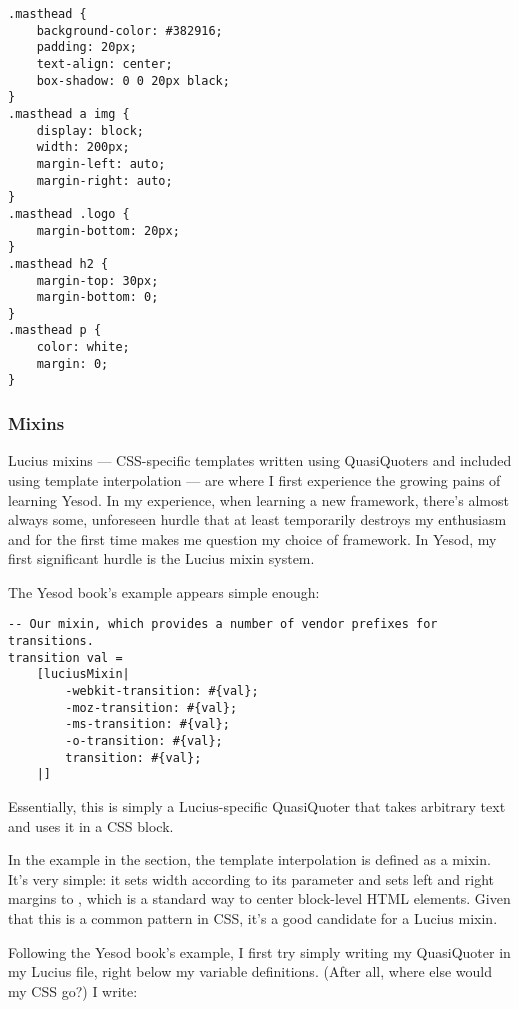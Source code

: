 \begin{Verbatim}[samepage=true]
.masthead {
    background-color: #382916;
    padding: 20px;
    text-align: center;
    box-shadow: 0 0 20px black;
}
.masthead a img {
    display: block;
    width: 200px;
    margin-left: auto;
    margin-right: auto;
}
.masthead .logo {
    margin-bottom: 20px;
}
.masthead h2 {
    margin-top: 30px;
    margin-bottom: 0;
}
.masthead p {
    color: white;
    margin: 0;
}
\end{Verbatim}

\subsubsection{Mixins} \label{luciusMixins}

Lucius mixins --- CSS-specific templates written using QuasiQuoters and included using template interpolation --- are where I first experience the growing pains of learning Yesod. In my experience, when learning a new framework, there's almost always some, unforeseen hurdle that at least temporarily destroys my enthusiasm and for the first time makes me question my choice of framework. In Yesod, my first significant hurdle is the Lucius mixin system. 

The Yesod book's example \cite{ybkShakes} appears simple enough:

\begin{Verbatim}[samepage=true]
-- Our mixin, which provides a number of vendor prefixes for transitions.
transition val =
    [luciusMixin|
        -webkit-transition: #{val};
        -moz-transition: #{val};
        -ms-transition: #{val};
        -o-transition: #{val};
        transition: #{val};
    |]
\end{Verbatim}

Essentially, this is simply a Lucius-specific QuasiQuoter that takes arbitrary text and uses it in a CSS block. 

In the example in the  section, the template interpolation  is defined as a mixin. It's very simple: it sets width according to its  parameter and sets left and right margins to , which is a standard way to center block-level HTML elements. Given that this is a common pattern in CSS, it's a good candidate for a Lucius mixin. 

Following the Yesod book's example, I first try simply writing my QuasiQuoter in my Lucius file, right below my variable definitions. (After all, where else would my CSS go?) I write:

